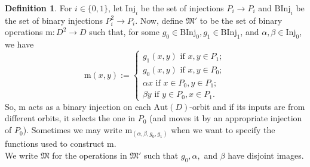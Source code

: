 \documentclass{article}
\newtheorem{lemma}[theorem]{Lemma}
\theoremstyle{remark}
\theoremstyle{definition}
\newtheorem{definition}[theorem]{Definition}
\begin{document}
\begin{definition}\label{def:mdef}
For $i\in\{0,1\}$, let $\mathrm{Inj}_i$ be the set of injections $P_i\to P_i$ and $\mathrm{BInj}_i$ be the set of binary injections $P_i^2\to P_i$. Now, define $\mathfrak{M}'$ to be the set of binary operations $\mathrm{m}:D^2\to D$ such that, for some $g_0\in \mathrm{BInj}_0, g_1\in \mathrm{BInj}_1$, and $\alpha, \beta\in \mathrm{Inj}_0$, we have
\[\mathrm{m}(x,y):=\begin{cases} g_1(x,y) \text{ if } x,y\in P_1;\\
g_0(x,y) \text{ if } x,y\in P_0;\\
\alpha x \text{ if } x\in P_0, y\in P_1;\\
\beta y \text{ if } y\in P_0, x\in P_1.
    \end{cases}
    \]
So, $\mathrm{m}$ acts as a binary injection on each $\mathrm{Aut}(D)$-orbit and if its inputs are from different orbits, it selects the one in $P_0$ (and moves it by an appropriate injection of $P_0$). Sometimes we may write $\mathrm{m}_{(\alpha, \beta, g_0, g_1)}$ when we want to specify the functions used to construct $\mathrm{m}$.\\

We write $\mathfrak{M}$ for the operations in $\mathfrak{M}'$ such that $g_0, \alpha,$ and $\beta$ have disjoint images.
\end{definition}



\end{document}
